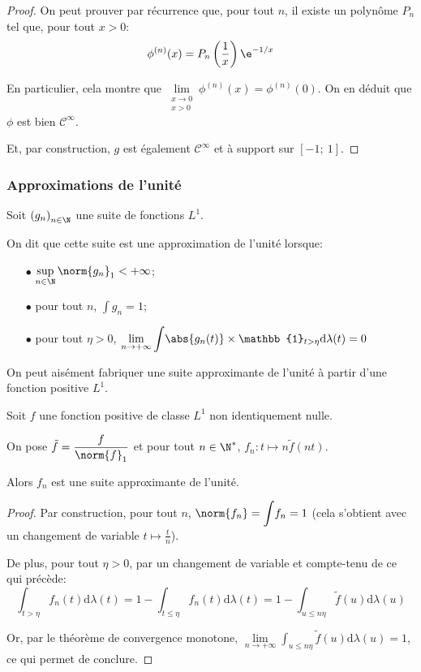 \begin{proof}
On peut prouver par récurrence que, pour tout $n$, il existe un polynôme $P_n$ tel que, pour tout $x > 0$:
\[
\phi^{(n)}(x) = P_n\left(\frac{1}{x}\right) \e^{-1/x}
\]

En particulier, cela montre que $\lim \limits_{\substack{x \to 0\\x>0}} \phi^{(n)}(x) = \phi^{(n)}(0)$. On en déduit que $\phi$ est bien $\mathcal{C}^{\infty}$.

Et, par construction, $g$ est également $\mathcal{C}^{\infty}$ et à support sur $[-1;~1]$.
\end{proof}

\subsubsection{Approximations de l'unité}

\begin{de}
Soit $\left(g_n\right)_{n \in \N}$ une suite de fonctions $L^1$.

On dit que cette suite est une approximation de l'unité lorsque:
\begin{itemize}
\item[$\bullet$] $\sup \limits_{n \in \N} \norm{g_n}_1 < +\infty$;
\item[$\bullet$] pour tout $n$, $\displaystyle{\int} g_n = 1$;
\item[$\bullet$] pour tout $\eta > 0$, $\lim \limits_{n \to +\infty} \displaystyle{\int} \abs{g_n(t)} \times \mathbb{1}_{t > \eta} \mathrm d \lambda(t) = 0$
\end{itemize}
\end{de}

On peut aisément fabriquer une suite approximante de l'unité à partir d'une fonction positive $L^1$.

\begin{prop}
Soit $f$ une fonction positive de classe $L^1$ non identiquement nulle. 

On pose $\tilde{f} = \dfrac{f}{\norm{f}_1}$ et pour tout $n \in \N^*$, $f_n: t \mapsto n\tilde{f}(nt)$.

Alors $f_n$ est une suite approximante de l'unité.
\end{prop}

\begin{proof}
Par construction, pour tout $n$, $\norm{f_n} = \displaystyle{\int} f_n = 1$ (cela s'obtient avec un changement de variable $t \mapsto \frac{t}{n}$).

De plus, pour tout $\eta	>0$, par un changement de variable et compte-tenu de ce qui précède:
\[
\displaystyle{\int_{t>\eta}} f_n(t) \mathrm d \lambda(t) = 1-\displaystyle{\int_{t \leq \eta}} f_n(t) \mathrm d \lambda(t) = 1-\displaystyle{\int_{u \leq n \eta}} \tilde{f}(u) \mathrm d \lambda(u)
\]

Or, par le théorème de convergence monotone, $\lim \limits_{n \to +\infty} \displaystyle{\int_{u \leq n \eta}} \tilde{f}(u) \mathrm d \lambda(u) = 1$, ce qui permet de conclure.
\end{proof}



